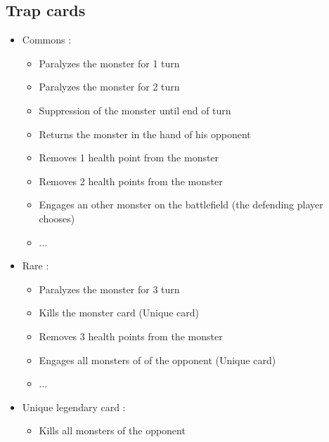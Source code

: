 \documentclass[a4paper,12pt]{book}
\begin{document}
\subsection{Trap cards}
\begin{itemize}
	\item Commons :
	\begin{itemize}
		\item Paralyzes the monster for 1 turn
		\item Paralyzes the monster for 2 turn
		\item Suppression of the monster until end of turn
		\item Returns the monster in the hand of his opponent
		\item Removes 1 health point from the monster
		\item Removes 2 health points from the monster
		\item Engages an other monster on the battlefield (the defending player chooses)
		\item ...
	\end{itemize}
	\item Rare :
	\begin{itemize}
		\item Paralyzes the monster for 3 turn
		\item Kills the monster card (Unique card)
		\item Removes 3 health points from the monster
		\item Engages all monsters of of the opponent (Unique card)
		\item ...
	\end{itemize}
	\item Unique legendary card :
	\begin{itemize}
		\item Kills all monsters of the opponent
	\end{itemize}
\end{itemize}
\end{document}
